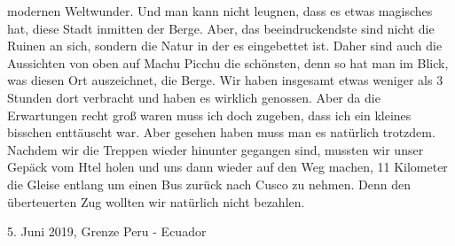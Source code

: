 \documentclass[11pt]{book}
\begin{document}
modernen Weltwunder. Und man kann nicht leugnen, dass es etwas magisches hat, diese Stadt inmitten der Berge. Aber, das beeindruckendste sind nicht die Ruinen 
an sich, sondern die Natur in der es eingebettet ist. Daher sind auch die Aussichten von oben auf Machu Picchu die schönsten, denn so hat man im Blick, 
was diesen Ort auszeichnet, die Berge. Wir haben insgesamt etwas weniger als 3 Stunden dort verbracht und haben es wirklich genossen. Aber da die Erwartungen 
recht groß waren muss ich doch zugeben, dass ich ein kleines bisschen enttäuscht war. Aber gesehen haben muss man es natürlich trotzdem. Nachdem wir die Treppen 
wieder hinunter gegangen sind, mussten wir unser Gepäck vom Htel holen und uns dann wieder auf den Weg machen, 11 Kilometer die Gleise entlang um einen 
Bus zurück nach Cusco zu nehmen. Denn den überteuerten Zug wollten wir natürlich nicht bezahlen.

5. Juni 2019, Grenze Peru - Ecuador
\end{document}
